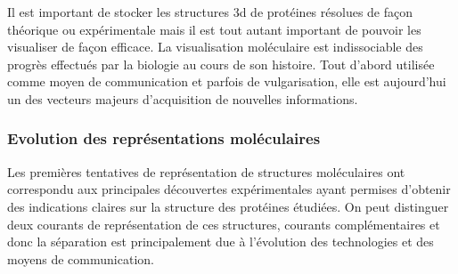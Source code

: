 Il est important de stocker les structures 3d de protéines résolues de façon théorique ou expérimentale mais il est tout autant important de pouvoir les visualiser de façon efficace. La visualisation moléculaire est indissociable des progrès effectués par la biologie au cours de son histoire. Tout d'abord utilisée comme moyen de communication et parfois de vulgarisation, elle est aujourd'hui un des vecteurs majeurs d'acquisition de nouvelles informations.

\subsubsection{Evolution des représentations moléculaires}

Les premières tentatives de représentation de structures moléculaires ont correspondu aux principales découvertes expérimentales ayant permises d'obtenir des indications claires sur la structure des protéines étudiées. On peut distinguer deux courants de représentation de ces structures, courants complémentaires et donc la séparation est principalement due à l'évolution des technologies et des moyens de communication.

